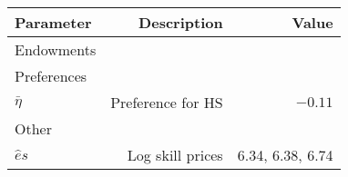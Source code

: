 \begin{tabular}{lrr}
\hline
Parameter & Description  & Value  \\ 
\hline
Endowments &   &   \\ 
Preferences &   &   \\ 
$\bar{\eta}$ & Preference for HS  & $-0.11$  \\ 
Other &   &   \\ 
$\hat{e}{s}$ & Log skill prices  & 6.34, 6.38, 6.74  \\ 
\hline
\end{tabular}%
